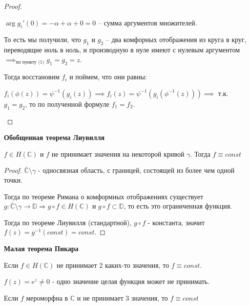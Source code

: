\begin{proof}
\begin{enumerate}
{\begin{enumerate}
{                    $\arg g_i'(0) = -\alpha + \alpha + 0 = 0$ -- сумма аргументов множителей.
                }
            \end{enumerate}

            То есть мы получили, что $g_1$ и $g_2$ -- два комфорных отображения из круга в круг, переводящие ноль в ноль, и производную в нуле имеют с нулевым аргументом $\implies_{\text{по пункту (1)}} g_1 = g_2 = z$.

            Тогда восстановим $f_i$ и поймем, что они равны:

            $f_i(\phi(z)) = \psi^{-1}(g_i(z)) \implies f_i(z) = \psi^{-1}(g_i(\phi^{-1}(z))) \implies$ т.к. $g_1 = g_2$, то по полученной формуле $f_1 = f_2$.
        }
    \end{enumerate}
\end{proof}

\begin{consequence}
    \textbf{Обобщенная теорема Лиувилля}

    $f \in H(\mathbb{C})$ и $f$ не принимает значения на некоторой кривой $\gamma$. Тогда
    $f \equiv const$
\end{consequence}

\begin{proof}
    $\bar{\mathbb{C}} \setminus \gamma$ - односвязная область, с границей, состоящей из более чем одной точки.

    Тогда по теореме Римана о комформных отображениях существует $g : \bar{\mathbb{C}} \setminus \gamma \to \mathbb{D} \Rightarrow g \circ f \in H(\mathbb{C})$ и $g \circ f \subset \mathbb{D}$, то есть
    это ограниченная функция.

    Тогда по теореме Лиувилля (стандартной), $g \circ f$ - константа, значит
    $f(z) = g^{-1} (const) = const$.
\end{proof}

\begin{remark}
    \textbf{Малая теорема Пикара}

    Если $f \in H(\mathbb{C})$ не принимает 2 каких-то значения, то 
    $f \equiv const$.
\end{remark}

\begin{example}
    $f(z) = e^z \neq 0$ - одно значение целая функция может не принимать.
\end{example}

\begin{consequence}
    Если $f$ мероморфна в $\mathbb{C}$ и не принимает 3 значения, то $f \equiv const$
\end{consequence}

